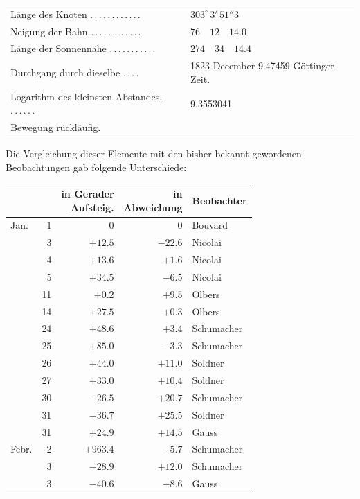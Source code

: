 \begin{center}
\begingroup\small
\begin{tabular}{p{.51\linewidth}p{.41\linewidth}}
Länge des Knoten \mbox{.\,.\,.\,.\,.\,.\,.\,.\,.\,.\,.\,.} & $303^\circ\,3'\,51''3$ \\
Neigung der Bahn \mbox{.\,.\,.\,.\,.\,.\,.\,.\,.\,.\,.\,.} & $76\quad12\quad14.0$ \\
Länge der Sonnennähe \mbox{.\,.\,.\,.\,.\,.\,.\,.\,.\,.\,.} & $274\quad34\quad14.4$ \\
Durchgang durch dieselbe \mbox{.\,.\,.\,.} & 1823 December 9.47459 Göttinger Zeit. \\
Logarithm des kleinsten Abstandes. \mbox{.\,.\,.\,.\,.\,.} & 9.3553041 \\
\multicolumn{2}{l}{Bewegung rückläufig.} \\
\end{tabular}
\endgroup
\end{center}

Die Vergleichung dieser Elemente mit den bisher bekannt gewordenen
Beobachtungen gab folgende Unterschiede:



\begin{center}
\begin{tabular}{lr|r|r|l}
 & & \shortstack{in Gerader\\Aufsteig.} & \shortstack{in\\Abweichung} & Beobachter \\
\hline
Jan. & 1 & 0 & 0 & Bouvard \\
 & 3 & $+12.5$ & $-22.6$ & Nicolai \\
 & 4 & $+13.6$ & $+1.6$ & Nicolai \\
 & 5 & $+34.5$ & $-6.5$ & Nicolai \\
 & 11 & $+0.2$ & $+9.5$ & Olbers \\
 & 14 & $+27.5$ & $+0.3$ & Olbers \\
 & 24 & $+48.6$ & $+3.4$ & Schumacher \\
 & 25 & $+85.0$ & $-3.3$ & Schumacher \\
 & 26 & $+44.0$ & $+11.0$ & Soldner \\
 & 27 & $+33.0$ & $+10.4$ & Soldner \\
 & 30 & $-26.5$ & $+20.7$ & Schumacher \\
 & 31 & $-36.7$ & $+25.5$ & Soldner \\
 & 31 & $+24.9$ & $+14.5$ & Gauss \\
Febr. & 2 & $+963.4$ & $-5.7$ & Schumacher \\
 & 3 & $-28.9$ & $+12.0$ & Schumacher \\
 & 3 & $-40.6$ & $-8.6$ & Gauss \\
\end{tabular}
\end{center}

